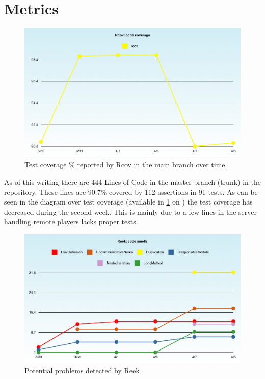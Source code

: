\documentclass[10pt, titlepage, oneside, a4paper]{article}
\begin{document}
	\section{Metrics}
	
	\begin{figure}[h!]
		\centering
			\ifpdf
				\includegraphics[width=\textwidth]{rcov.png}
			\fi
		\caption{Test coverage \% reported by Rcov in the main branch over time.}
		\label{fig:rcov}
	\end{figure}
	
	As of this writing there are 444 Lines of Code in the master branch (trunk) in the repository. These lines are 90.7\% covered by 112 assertions in 91 tests.
	As can be seen in the diagram over test coverage (available in \figurename{} \ref{fig:rcov} on \pagename{} \pageref{fig:rcov}) the test coverage has decreased during the second week. This is mainly due to a few lines in the server handling remote players  lacks proper tests.
	
		\begin{figure}[h!]
			\centering
				\ifpdf
					\includegraphics[width=\textwidth]{reek.png}
				\fi
			\caption{Potential problems detected by Reek}
			\label{fig:reek}
		\end{figure}
	
\end{document}
